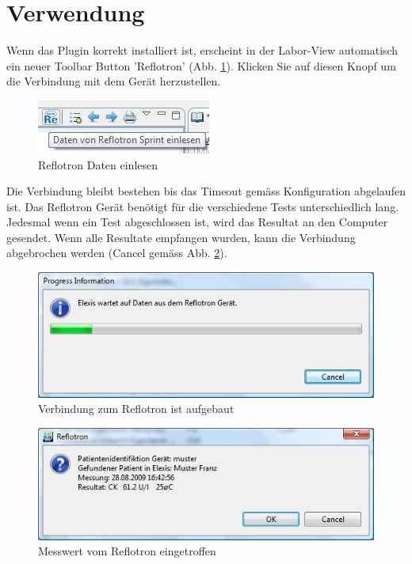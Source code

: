 \documentclass[a4paper]{scrartcl}
\begin{document}
\section{Verwendung}
Wenn das Plugin korrekt installiert ist, erscheint in der Labor-View automatisch ein neuer Toolbar Button 'Reflotron' (Abb. \ref{fig:toolbarbutton}). Klicken Sie auf diesen Knopf um die Verbindung mit dem Ger\"at herzustellen. 
\begin{figure}[h]
    \includegraphics{toolbarbutton}
    \caption{Reflotron Daten einlesen}
    \label{fig:toolbarbutton}
\end{figure}
Die Verbindung bleibt bestehen bis das Timeout gem\"ass Konfiguration abgelaufen ist. Das Reflotron Ger\"at ben\"otigt f\"ur die verschiedene Tests unterschiedlich lang. Jedesmal wenn ein Test abgeschlossen ist, wird das Resultat an den Computer gesendet. Wenn alle Resultate empfangen wurden, kann die Verbindung abgebrochen werden (Cancel gem\"ass Abb. \ref{fig:connected}).
\begin{figure}[h]
    \includegraphics{connected}
    \caption{Verbindung zum Reflotron ist aufgebaut}
    \label{fig:connected}
\end{figure}
\begin{figure}[h]
    \includegraphics{messwert}
    \caption{Messwert vom Reflotron eingetroffen}
    \label{fig:messwert}
\end{figure}
\end{document}
